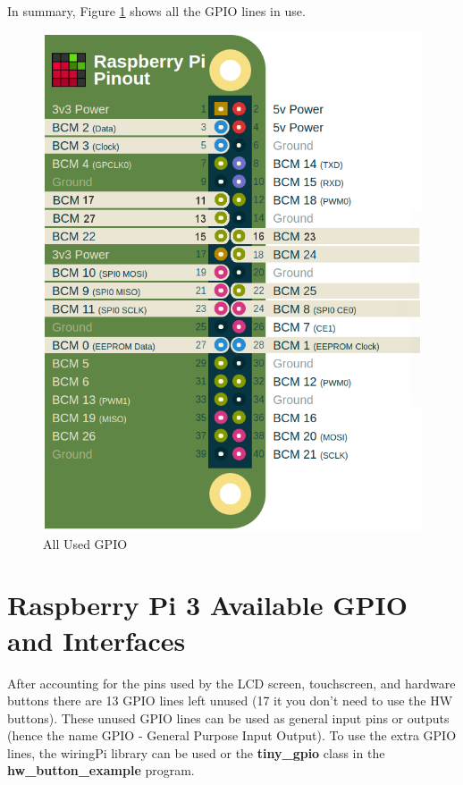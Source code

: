 \documentclass{article}
\begin{document}
In summary, Figure \ref{All_Used_GPIO} shows all the GPIO lines in use.


	\begin{figure}[H]
		\centering
		\includegraphics[scale=0.3]{pics/All_Used_GPIO.png}
		\caption{All Used GPIO}
		\label{All_Used_GPIO}
	\end{figure}

\section{Raspberry Pi 3 Available GPIO and Interfaces}

After accounting for the pins used by the LCD screen, touchscreen, and hardware buttons there are 13 GPIO lines left unused (17 it you don't need to use the HW buttons). These unused GPIO lines can be used as general input pins or outputs (hence the name GPIO - General Purpose Input Output). To use the extra GPIO lines, the wiringPi library can be used or the \textbf{tiny\_gpio} class in the \textbf{hw\_button\_example} program. \\
\end{document}
